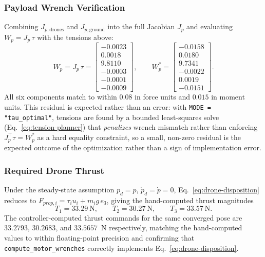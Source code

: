 \subsubsection{Payload Wrench Verification}
Combining $J_{p,\text{drones}}$ and $J_{p,\text{ground}}$ into the full Jacobian $J_p$ and
evaluating $W_p = J_p\,\tau$ with the tensions above:
\begin{equation}
W_p = J_p\,\tau =
\begin{bmatrix} -0.0023 \\ 0.0018 \\ 9.8110 \\ -0.0003 \\ -0.0001 \\ -0.0009 \end{bmatrix},
\qquad
W_p^* =
\begin{bmatrix} -0.0158 \\ 0.0180 \\ 9.7341 \\ -0.0022 \\ 0.0019 \\ -0.0151 \end{bmatrix}.
\end{equation}
All six components match to within $0.08$ in force units and $0.015$ in moment units. This
residual is expected rather than an error: with \texttt{MODE = "tau\_optimal"}, tensions are found
by a bounded least-squares solve (Eq.~\ref{eq:tension-planner}) that \emph{penalizes} wrench
mismatch rather than enforcing $J_p^\top \tau = W_p^*$ as a hard equality constraint, so a small,
non-zero residual is the expected outcome of the optimization rather than a sign of implementation
error.

\subsubsection{Required Drone Thrust}
Under the steady-state assumption $p_d = p$, $\dot{p}_d = \dot{p} = 0$,
Eq.~\ref{eq:drone-disposition} reduces to $F_{prop,i} = \tau_i u_i + m_i g\,e_3$, giving the
hand-computed thrust magnitudes
\begin{equation}
T_1 = 33.29~\text{N}, \qquad T_2 = 30.27~\text{N}, \qquad T_3 = 33.57~\text{N}.
\end{equation}
The controller-computed thrust commands for the same converged pose are $33.2793$, $30.2683$, and
$33.5657$~N respectively, matching the hand-computed values to within floating-point precision and
confirming that \texttt{compute\_motor\_wrenches} correctly implements
Eq.~\ref{eq:drone-disposition}.

